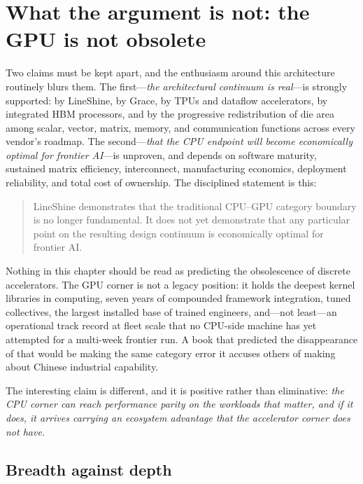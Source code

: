 \section{What the argument is not: the GPU is not obsolete}
\label{sec:notobsolete}

Two claims must be kept apart, and the enthusiasm around this architecture routinely blurs them. The first---\emph{the architectural continuum is real}---is strongly supported: by LineShine, by Grace, by TPUs and dataflow accelerators, by integrated HBM processors, and by the progressive redistribution of die area among scalar, vector, matrix, memory, and communication functions across every vendor's roadmap. The second---\emph{that the CPU endpoint will become economically optimal for frontier AI}---is unproven, and depends on software maturity, sustained matrix efficiency, interconnect, manufacturing economics, deployment reliability, and total cost of ownership. The disciplined statement is this:

\begin{quote}
LineShine demonstrates that the traditional CPU--GPU category boundary is no longer fundamental. It does not yet demonstrate that any particular point on the resulting design continuum is economically optimal for frontier AI.
\end{quote}

Nothing in this chapter should be read as predicting the obsolescence of discrete accelerators. The GPU corner is not a legacy position: it holds the deepest kernel libraries in computing, seven years of compounded framework integration, tuned collectives, the largest installed base of trained engineers, and---not least---an operational track record at fleet scale that no CPU-side machine has yet attempted for a multi-week frontier run. A book that predicted the disappearance of that would be making the same category error it accuses others of making about Chinese industrial capability.

The interesting claim is different, and it is positive rather than eliminative: \emph{the CPU corner can reach performance parity on the workloads that matter, and if it does, it arrives carrying an ecosystem advantage that the accelerator corner does not have.}

\subsection{Breadth against depth}
\label{sec:breadth-depth}

